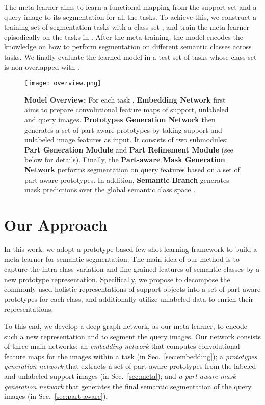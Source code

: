 \documentclass[runningheads]{llncs}
\begin{document}
The meta learner  aims to learn a functional mapping from the support set  and a query image  to its segmentation  for all the tasks. To achieve this, we construct a training set of segmentation tasks  with a class set , and train the meta learner episodically on the tasks in . After the meta-training, the model  encodes the knowledge on how to perform segmentation on different semantic classes across tasks. We finally evaluate the learned model in a test set of tasks  whose class set  is non-overlapped with . 

\begin{figure}[t] 
	\centering
	\texttt{[image: overview.png]}
	\caption{ {\small \textbf{Model Overview:} For each task , \textbf{Embedding Network} first aims to prepare convolutional feature maps of support, unlabeled and query images. \textbf{Prototypes Generation Network} then generates a set of part-aware prototypes by taking support and unlabeled image features as input. It consists of two submodules: \textbf{Part Generation Module} and \textbf{Part Refinement Module} (see below for details). Finally, the \textbf{Part-aware Mask Generation Network} performs segmentation on query features based on a set of part-aware prototypes. In addition, \textbf{Semantic Branch} generates mask predictions over the global semantic class space .}}
	\label{fig-overview}
\end{figure}

\section{Our Approach}
In this work, we adopt a prototype-based few-shot learning framework to build a meta learner  for semantic segmentation. 
The main idea of our method is to capture the intra-class variation and fine-grained features of semantic classes by a new prototype representation. 
Specifically, we propose to decompose the commonly-used holistic representations of support objects into a set of part-aware prototypes for each class, and additionally utilize unlabeled data to enrich their representations.

To this end, we develop a deep graph network, as our meta learner, to encode such a new representation and to segment the query images. Our network consists of three main networks:  
an \textit{embedding network} that computes convolutional feature maps for the images within a task (in Sec.~\ref{sec:embedding}); 
a \textit{prototypes generation network} that extracts a set of part-aware prototypes from the labeled and unlabeled support images (in Sec.~\ref{sec:meta}); 
and \textit{a part-aware mask generation network} that generates the final semantic segmentation of the query images (in Sec.~\ref{sec:part-aware}).
 
\end{document}
